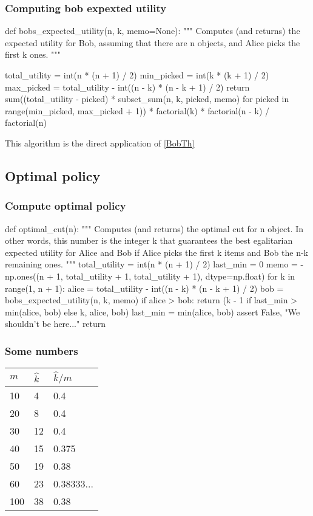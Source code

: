 \documentclass[a4paper, english, 10pt]{article}
\begin{document}
\subsubsection{Computing bob expexted utility}

	\begin{customFrame}
	def bobs_expected_utility(n, k, memo=None):
	"""
	Computes (and returns) the expected utility for Bob, assuming
	that there are n objects, and Alice picks the first k ones.
	"""
	
	total_utility = int(n * (n + 1) / 2)
	min_picked = int(k * (k + 1) / 2)
	max_picked = total_utility - int((n - k) * (n - k + 1) / 2)
	return sum((total_utility - picked) * subset_sum(n, k, picked, memo)
	for picked in range(min_picked, max_picked + 1)) * factorial(k) * factorial(n - k) / factorial(n)		
	\end{customFrame}
This algorithm is the direct application of \ref{BobTh}

\subsection{Optimal policy}

\subsubsection{Compute optimal policy}

	\begin{customFrame}
	def optimal_cut(n):
	"""
	Computes (and returns) the optimal cut for n object. In other words,
	this number is the integer k that guarantees the best egalitarian expected
	utility for Alice and Bob if Alice picks the first k items and Bob the n-k
	remaining ones.
	"""
	total_utility = int(n * (n + 1) / 2)
	last_min = 0
	memo = -np.ones((n + 1, total_utility + 1, total_utility + 1), dtype=np.float)
	for k in range(1, n + 1):
	alice = total_utility - int((n - k) * (n - k + 1) / 2)
	bob = bobs_expected_utility(n, k, memo)
	if alice > bob:
	return (k - 1 if last_min > min(alice, bob) else k,
	alice, bob)
	last_min = min(alice, bob)
	assert False, "We shouldn't be here..."
	return	
\end{customFrame}

\subsubsection{Some numbers}

\begin{tabular}{lll}
  \toprule
  $m$ & $\hat{k}$ & $\hat{k} / m$\\
  \midrule
  10 & 4 & 0.4\\
  20 & 8 & 0.4\\
  30 & 12 & 0.4\\
  40 & 15 & 0.375\\
  50 & 19 & 0.38\\
  60 & 23 & 0.38333...\\
  100 & 38 & 0.38\\
  \bottomrule
\end{tabular}



% 
% 
\end{document}
